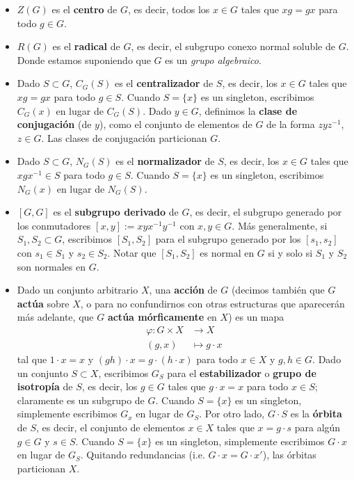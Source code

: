 \documentclass[spanish,10pt]{amsart}
\theoremstyle{definition}
\theoremstyle{remark}
\numberwithin{equation}{section}
\begin{document}
\begin{itemize}
\item $Z(G)$ es el \textbf{centro} de $G$, es decir, todos los $x \in G$ tales que $x g = g x$ para todo $g \in G$.
\item $R(G)$ es el \textbf{radical} de $G$, es decir, el subgrupo conexo normal soluble de $G$. Donde estamos suponiendo que $G$ es un \textit{grupo algebraico}.
\item Dado $S \subset G$, $C_G (S)$ es el \textbf{centralizador} de $S$, es decir, los $x \in G$ tales que $x g = g x$ para todo $g \in S$. Cuando $S = \{x\}$ es un singleton, escribimos $C_G (x)$ en lugar de $C_G (S)$. Dado $y \in G$, definimos la \textbf{clase de conjugación} (de $y$), como el conjunto de elementos de $G$ de la forma $z y z^{-1}$, $z \in G$. Las clases de conjugación particionan $G$.
\item Dado $S \subset G$, $N_G (S)$ es el \textbf{normalizador} de $S$, es decir, los $x \in G$ tales que $x g x^{-1} \in S$ para todo $g \in S$. Cuando $S = \{x\}$ es un singleton, escribimos $N_G (x)$ en lugar de $N_G (S)$.
\item $[G,G]$ es el \textbf{subgrupo derivado} de $G$, es decir, el subgrupo generado por los conmutadores $[x,y] := x y x^{-1}y^{-1}$ con $x,y \in G$. Más generalmente, si $S_1, S_2 \subset G$, escribimos $[S_1, S_2]$ para el subgrupo generado por los $[s_1,s_2]$ con $s_1 \in S_1 $ y $s_2 \in S_2$. Notar que $[S_1,S_2]$ es normal en $G$ si y solo si $S_1$ y $S_2$ son normales en $G$.
\item Dado un conjunto arbitrario $X$, una \textbf{acción} de $G$ (decimos también que $G$ \textbf{actúa} sobre $X$, o para no confundirnos con otras estructuras que aparecerán más adelante, que $G$ \textbf{actúa mórficamente} en $X$) es un mapa
\begin{align*}
\varphi : G \times X &\longrightarrow X \\
(g,x) &\longmapsto g \cdot x
\end{align*}
tal que $1 \cdot x = x$ y $(gh) \cdot x = g \cdot (h \cdot x)$ para todo $x \in X$ y $g,h \in G$. Dado un conjunto $S \subset X$, escribimos $G_S$ para el \textbf{estabilizador} o \textbf{grupo de isotropía} de $S$, es decir, los $g \in G$ tales que $g \cdot x = x$ para todo $x \in S$; claramente es un subgrupo de $G$. Cuando $S = \{x\}$ es un singleton, simplemente escribimos $G_x$ en lugar de $G_S$. Por otro lado, $G \cdot S$ es la \textbf{órbita} de $S$, es decir, el conjunto de elementos $x \in X$ tales que $x = g \cdot s$ para algún $g \in G$ y $s \in S$. Cuando $S = \{x\}$ es un singleton, simplemente escribimos $G \cdot x$ en lugar de $G_S$. Quitando redundancias (i.e. $G \cdot x = G \cdot x'$), las órbitas particionan $X$.

\end{itemize}
\end{document}
